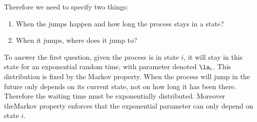 \documentclass{article}
\begin{document}
    \begin{center}
    \end{center}

    Therefore we need to specify two things:
    \begin{enumerate}
        \item When the jumps happen and how long the process stays in a state?
        \item When it jumps, where does it jump to?
    \end{enumerate}
    To answer the first question, given the process is in state $i$, it will stay in this state for an exponential random time, with parameter denoted $\la_i$. This distribution is fixed by the Markov property. When the process will jump in the future only depends on its current state, not on how long it has been there. Therefore the waiting time must be exponentially distributed. Moreover theMarkov property enforces that the exponential parameter can only depend on state $i$.

\end{document}
